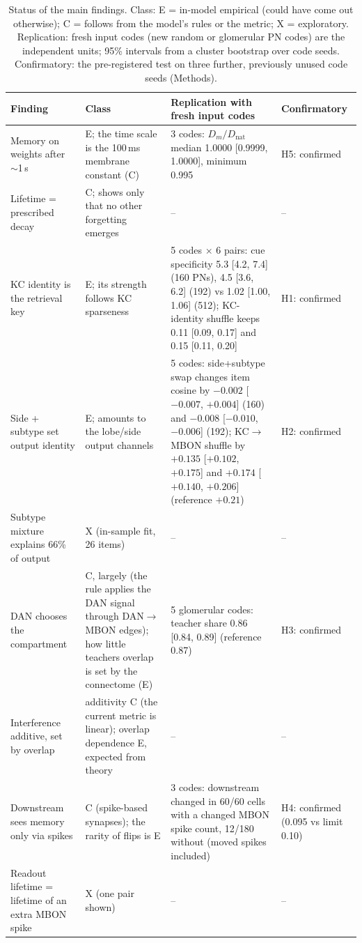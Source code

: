 \documentclass[conference]{IEEEtran}
\begin{document}
\begin{table}[t]
\caption{Status of the main findings.
Class: E = in-model empirical (could have come out otherwise);
C = follows from the model's rules or the metric; X = exploratory.
Replication: fresh input codes (new random or glomerular PN codes) are the
independent units; 95\% intervals from a cluster bootstrap over code seeds.
Confirmatory: the pre-registered test on three further, previously
unused code seeds (Methods).}
\label{tab:status}\centering\footnotesize\setlength{\tabcolsep}{3pt}
\begin{tabular}{@{}p{}p{}p{}p{}@{}}\toprule
Finding & Class & Replication with fresh input codes & Confirmatory\\\midrule
Memory on weights after $\sim$1\,s & E; the time scale is the 100\,ms
membrane constant (C) & 3 codes: $D_m/D_\mathrm{nat}$ median 1.0000 [0.9999,
1.0000], minimum 0.995 & H5: confirmed\\
Lifetime = prescribed decay & C; shows only that no other forgetting emerges &
-- & --\\
KC identity is the retrieval key & E; its strength follows KC sparseness &
5 codes $\times$ 6 pairs: cue specificity 5.3 [4.2, 7.4] (160 PNs), 4.5 [3.6,
6.2] (192) vs 1.02 [1.00, 1.06] (512); KC-identity shuffle keeps 0.11 [0.09,
0.17] and 0.15 [0.11, 0.20] & H1: confirmed\\
Side + subtype set output identity & E; amounts to the lobe/side output
channels & 5 codes: side+subtype swap changes item cosine by $-0.002$
[$-0.007$, $+0.004$] (160) and $-0.008$ [$-0.010$, $-0.006$] (192);
KC$\rightarrow$MBON shuffle by $+0.135$ [$+0.102$, $+0.175$] and $+0.174$
[$+0.140$, $+0.206$] (reference $+0.21$) & H2: confirmed\\
Subtype mixture explains 66\% of output & X (in-sample fit, 26 items) & -- & --\\
DAN chooses the compartment & C, largely (the rule applies the DAN signal
through DAN$\rightarrow$MBON edges); how little teachers overlap is set by the
connectome (E) & 5 glomerular codes: teacher share 0.86 [0.84, 0.89] (reference
0.87) & H3: confirmed\\
Interference additive, set by overlap & additivity C (the current metric is
linear); overlap dependence E, expected from theory
\cite{dasgupta2017,shen2023} & -- & --\\
Downstream sees memory only via spikes & C (spike-based synapses); the rarity
of flips is E & 3 codes: downstream changed in 60/60 cells with a changed MBON
spike count, 12/180 without (moved spikes included) & H4: confirmed (0.095 vs limit 0.10)\\
Readout lifetime = lifetime of an extra MBON spike & X (one pair shown) & -- &
--\\\bottomrule
\end{tabular}
\end{table}
\end{document}
